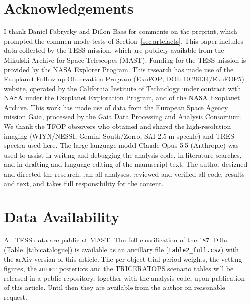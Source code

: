 \documentclass[fleqn,usenatbib]{mnras}
\begin{document}
\section*{Acknowledgements}

I thank Daniel Fabrycky and Dillon Bass for comments on the preprint, which prompted the common-mode tests of Section~\ref{sec:artefacts}. This paper includes data collected by the TESS mission, which are publicly available from the Mikulski Archive for Space Telescopes (MAST). Funding for the TESS mission is provided by the NASA Explorer Program. This research has made use of the Exoplanet Follow-up Observation Program (ExoFOP; DOI: 10.26134/ExoFOP5) website, operated by the California Institute of Technology under contract with NASA under the Exoplanet Exploration Program, and of the NASA Exoplanet Archive. This work has made use of data from the European Space Agency mission Gaia, processed by the Gaia Data Processing and Analysis Consortium. We thank the TFOP observers who obtained and shared the high-resolution imaging (WIYN/NESSI, Gemini-South/Zorro, SAI 2.5-m speckle) and TRES spectra used here. The large language model Claude Opus 5.5 (Anthropic) was used to assist in writing and debugging the analysis code, in literature searches, and in drafting and language editing of the manuscript text. The author designed and directed the research, ran all analyses, reviewed and verified all code, results and text, and takes full responsibility for the content.

\section*{Data Availability}

All TESS data are public at MAST. The full classification of the 187 TOIs (Table~\ref{tab:catalogue}) is available as an ancillary file (\texttt{table2\_full.csv}) with the arXiv version of this article. The per-object trial-period weights, the vetting figures, the \textsc{juliet} posteriors and the TRICERATOPS scenario tables will be released in a public repository, together with the analysis code, upon publication of this article. Until then they are available from the author on reasonable request.
\end{document}
